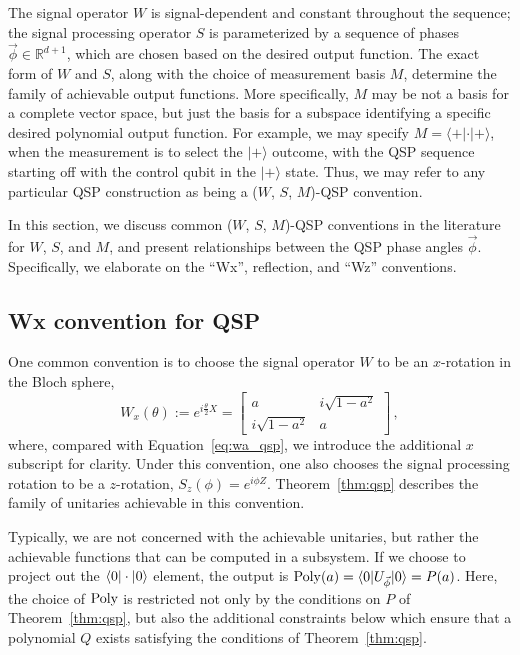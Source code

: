 \documentclass[aps,pra,showpacs,notitlepage,twocolumn,superscriptaddress,nofootinbib]{revtex4-1}
\def\>{\rangle}
\def\<{\langle}
\newcommand{\be}{\begin{equation}}
\newcommand{\ee}{\end{equation}}
\newcommand{\mattwocb}[4]{\left[
	\begin{array}{cc}{#1}&{#2}\\{#3}&{#4}\end{array}\right]}
\begin{document}
The signal operator $W$ is signal-dependent and constant throughout the sequence;
the signal processing operator $S$ is parameterized by a sequence of phases $\vec\phi \in \mathbb{R}^{d+1}$, which are chosen based on the desired output function.
The exact form of $W$ and $S$, along with the choice of measurement basis $M$, determine the family of achievable output functions.  More specifically, $M$ may be not a basis for a complete vector space, but just the basis for a subspace identifying a specific desired polynomial output function.  For example, we may specify $M=\<+|\cdot |+\>$, when the measurement is to select the $|+\>$ outcome, with the QSP sequence starting off with the control qubit in the $|+\>$ state.  Thus, we may refer to any particular QSP construction as being a ($W$, $S$, $M$)-QSP convention.

In this section, we discuss common ($W$, $S$, $M$)-QSP conventions in the literature for $W$, $S$, and $M$, and present relationships between the QSP phase angles $\vec{\phi}$.  Specifically, we elaborate on the ``Wx'', reflection, and ``Wz'' conventions.

\subsection{Wx convention for QSP}

One common convention is to choose the signal operator $W$ to be an $x$-rotation in the Bloch sphere,
\be
W_x(\theta) := e^{i \frac{\theta}{2} X} = \mattwocb{a}{i \sqrt{1-a^2}}{i \sqrt{1-a^2}}{a}
\,,
\label{eq:wa_qsp_x}
\ee
where, compared with Equation~\ref{eq:wa_qsp}, we introduce the additional $x$ subscript for clarity. Under this convention, one also chooses the signal processing rotation to be a $z$-rotation, $S_z(\phi) = e^{i \phi Z}$.
Theorem~\ref{thm:qsp} describes the family of unitaries achievable in this convention.

Typically, we are not concerned with the achievable unitaries, but rather the achievable functions that can be computed in a subsystem.
If we choose to project out the $\braket{0 | \cdot | 0}$ element, the output is ${\rm Poly}(a) = \braket{0 | U_{\vec\phi} | 0} = P(a)$.
Here, the choice of ${\rm Poly}$ is restricted not only by the conditions on $P$ of Theorem~\ref{thm:qsp}, but also the additional constraints below which ensure that a polynomial $Q$ exists satisfying the conditions of Theorem~\ref{thm:qsp}.
\end{document}
